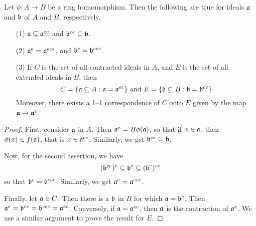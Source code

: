 \begin{lemma}\label{1.10.4}
    Let $\phi:A \xrightarrow{} B$ be a ring homomorphism. Then the following are
    true for ideals $\af$ and  $\bf$ of  $A$ and  $B$, respectively.
    \begin{enumerate}
        \item[(1)] $\af \subseteq \af^{ec}$ and $\bf^{ce} \subseteq \bf$.

        \item[(2)] $\af^e=\af^{ece}$, and $\bf^c=\bf^{cec}$.

        \item[(3)] If $C$ is the set of all contracted ideals in $A$, and  $E$
            is the set of all extended ideals in  $B$, then
            \begin{equation*}
                C=\{\af \subseteq A : \af=\af^{ec}\} \text{ and }
                E=\{\bf \subseteq B : \bf=\bf^{ce}\}
            \end{equation*}
            Moreover, there exists a 1--1 correspondence of $C$ onto $E$  given
            by the map $\af \xrightarrow{} \af^e$.
    \end{enumerate}
\end{lemma}
\begin{proof}
    First, consider $\af$ in  $A$. Then  $\af^e=B\phi(\af)$, so that if $x \in
    \af$, then  $\phi(x) \in f(\af)$, that is $x \in \af^{ec}$. Similarly, we
    get $\bf^{ce} \subseteq \bf$.

    Now, for the second assertion, we have
    \begin{equation*}
        (\bf^{ce})^c \subseteq \bf^c \subseteq (\bf^c)^{ec}
    \end{equation*}
    so that $\bf^c=\bf^{cec}$. Similarly, we get $\af^e=\af^{ece}$.

    Finally, let $\af \in C$. Then there is a $\bf$ in $B$ for which
    $\af=\bf^c$. Then  $\af^e=\bf^{ce}=\bf^{cec}=\af^{ec}$. Conversely, if
    $\af=\af^{ec}$, then $\af$ is the contraction of $\af^e$. We use a similar
    argument to prove the result for $E$.
\end{proof}

